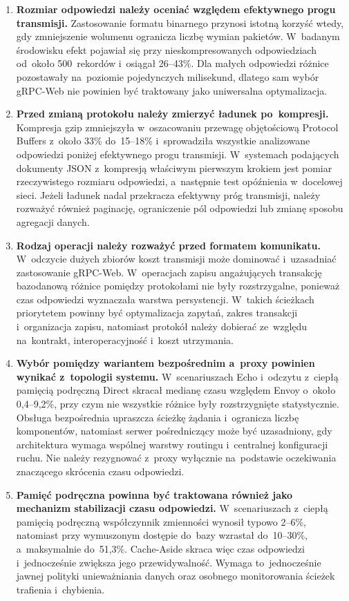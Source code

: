 \begin{enumerate}
    \item \textbf{Rozmiar odpowiedzi należy oceniać względem efektywnego progu transmisji.} Zastosowanie formatu binarnego przynosi istotną korzyść wtedy, gdy zmniejszenie wolumenu ogranicza liczbę wymian pakietów. W~badanym środowisku efekt pojawiał się przy nieskompresowanych odpowiedziach od~około 500~rekordów i~osiągał 26--43\%. Dla małych odpowiedzi różnice pozostawały na~poziomie pojedynczych milisekund, dlatego sam wybór gRPC-Web nie powinien być traktowany jako uniwersalna optymalizacja.

    \item \textbf{Przed zmianą protokołu należy zmierzyć ładunek po~kompresji.} Kompresja gzip zmniejszyła w~oszacowaniu przewagę objętościową Protocol Buffers z~około 33\% do~15--18\% i~sprowadziła wszystkie analizowane odpowiedzi poniżej efektywnego progu transmisji. W~systemach podających dokumenty JSON z~kompresją właściwym pierwszym krokiem jest pomiar rzeczywistego rozmiaru odpowiedzi, a~następnie test opóźnienia w~docelowej sieci. Jeżeli ładunek nadal przekracza efektywny próg transmisji, należy rozważyć również paginację, ograniczenie pól odpowiedzi lub zmianę sposobu agregacji danych.

    \item \textbf{Rodzaj operacji należy rozważyć przed formatem komunikatu.} W~odczycie dużych zbiorów koszt transmisji może dominować i~uzasadniać zastosowanie gRPC-Web. W~operacjach zapisu angażujących transakcję bazodanową różnice pomiędzy protokołami nie były rozstrzygalne, ponieważ czas odpowiedzi wyznaczała warstwa persystencji. W~takich ścieżkach priorytetem powinny być optymalizacja zapytań, zakres transakcji i~organizacja zapisu, natomiast protokół należy dobierać ze~względu na~kontrakt, interoperacyjność i~koszt utrzymania.

    \item \textbf{Wybór pomiędzy wariantem bezpośrednim a~proxy powinien wynikać z~topologii systemu.} W~scenariuszach Echo i~odczytu z~ciepłą pamięcią podręczną Direct skracał medianę czasu względem Envoy o~około 0,4--9,2\%, przy czym nie wszystkie różnice były rozstrzygnięte statystycznie. Obsługa bezpośrednia upraszcza ścieżkę żądania i~ogranicza liczbę komponentów, natomiast serwer pośredniczący może być uzasadniony, gdy architektura wymaga wspólnej warstwy routingu i~centralnej konfiguracji ruchu. Nie należy rezygnować z~proxy wyłącznie na~podstawie oczekiwania znaczącego skrócenia czasu odpowiedzi.

    \item \textbf{Pamięć podręczna powinna być traktowana również jako mechanizm stabilizacji czasu odpowiedzi.} W~scenariuszach z~ciepłą pamięcią podręczną współczynnik zmienności wynosił typowo 2--6\%, natomiast przy wymuszonym dostępie do~bazy wzrastał do~10--30\%, a~maksymalnie do~51,3\%. Cache-Aside skraca więc czas odpowiedzi i~jednocześnie zwiększa jego przewidywalność. Wymaga to~jednocześnie jawnej polityki unieważniania danych oraz osobnego monitorowania ścieżek trafienia i~chybienia.
\end{enumerate}

